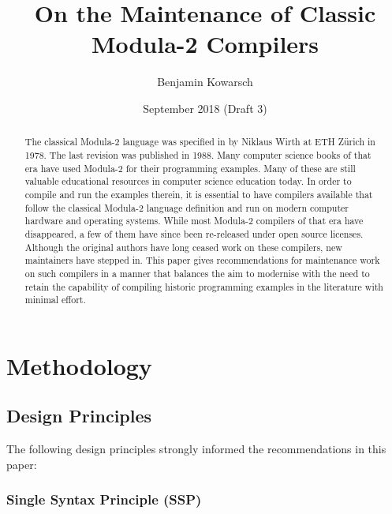 \documentclass[10pt,a4paper]{article}
\title{On the Maintenance of Classic Modula-2 Compilers}
\author{Benjamin Kowarsch}
\date{September 2018 (Draft 3)}
\makeatletter
\newcommand{\verbatimfont}[1]{\def\verbatim@font{#1}}
\makeatother
\begin{document}
\verbatimfont{\fontfamily{lmtt}\selectfont}
\maketitle

\begin{abstract}
The classical Modula-2 language was specified in \cite{Wirth78} by Niklaus Wirth
at ETH Z\"{u}rich in 1978. The last revision \cite{Wirth88} was published in 1988.
Many computer science books of that era have used Modula-2 for their programming
examples. Many of these are still valuable educational resources in computer
science education today. In order to compile and run the examples therein, it is
essential to have compilers available that follow the classical Modula-2 language
definition and run on modern computer hardware and operating systems. While most
Modula-2 compilers of that era have disappeared, a few of them have since been
re-released under open source licenses. Although the original authors have long
ceased work on these compilers, new maintainers have stepped in. This paper gives
recommendations for maintenance work on such compilers in a manner that balances
the aim to modernise with the need to retain the capability of compiling historic
programming examples in the literature with minimal effort.
\end{abstract}


\section{Methodology}

\subsection{Design Principles}

The following design principles strongly informed the recommendations in this paper:

\subsubsection{Single Syntax Principle (SSP)}
\end{document}
